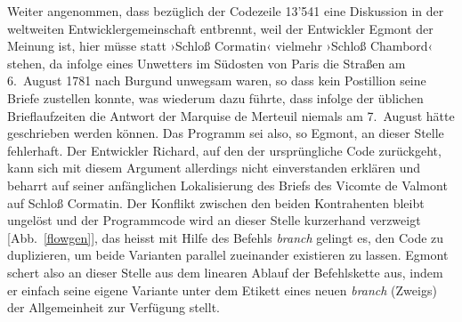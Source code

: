 \documentclass[a4paper,11pt]{article}
\newcommand{\inanf}[1]{›#1‹}
\newcommand{\anzeige}{\textbf{\color{hokkaido}\huge{\raisebox{-0.18ex}{$\bullet$}}\color{black}}}
\begin{document}
\begin{comment}

Warum Gefährliche Liebschaften so gut geeignet ist: Relativ in der Zeit, so kommt aber kein Programm durch. Es muss _in_ der Zeit laufen...

Es ist eine Auswahl an Briefen, d.h. es können jederzeit irgendwo noch weitere zwischengeschoben werden... Ein dynamisches Unterfangen.

\end{comment}

Weiter angenommen, dass bezüglich der Codezeile 13'541 eine Diskussion in der weltweiten Entwicklergemeinschaft entbrennt, weil der Entwickler {\color{hokkaido}Egmont} der Meinung ist, hier müsse statt \inanf{Schloß Cormatin} vielmehr \inanf{Schloß Chambord} stehen, da infolge eines Unwetters im Südosten von Paris die Straßen am 6.~August 1781 nach Burgund unwegsam waren, so dass kein Postillion seine Briefe zustellen konnte, was wiederum dazu führte, dass infolge der üblichen Brieflaufzeiten die Antwort der Marquise de Merteuil niemals am 7.~August hätte geschrieben werden können. Das Programm sei also, so {\color{hokkaido}Egmont}, an dieser Stelle fehlerhaft. Der Entwickler {\color{dzug}Richard}, auf den der ursprüngliche Code zurückgeht, kann sich mit diesem Argument allerdings nicht einverstanden erklären und beharrt auf seiner anfänglichen Lokalisierung des Briefs des Vicomte de Valmont auf Schloß Cormatin. Der Konflikt zwischen den beiden Kontrahenten bleibt ungelöst und der Programmcode wird an dieser Stelle kurzerhand verzweigt [\anzeige Abb.~\ref{flowgen}], das heisst mit Hilfe des Befehls \emph{branch} gelingt es, den Code zu duplizieren, um beide Varianten parallel zueinander existieren zu lassen. {\color{hokkaido}Egmont} schert also an dieser Stelle aus dem linearen Ablauf der Befehlskette aus, indem er einfach seine eigene Variante unter dem Etikett eines neuen \emph{branch} (Zweigs) der Allgemeinheit zur Verfügung stellt.
\end{document}
